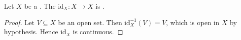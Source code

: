 \begin{proposition} \label{proposition:identity_function_between_topological_spaces_is_continuous}
    Let $X$ be a . The  $\mathrm{id}_X : X \to X$ is .
\end{proposition}
\begin{proof}
    Let $V \subseteq X$ be an open set. Then $\mathrm{id}_X^{-1}(V) = V$, which is open in $X$ by hypothesis. Hence $\mathrm{id}_X$ is continuous.
\end{proof}